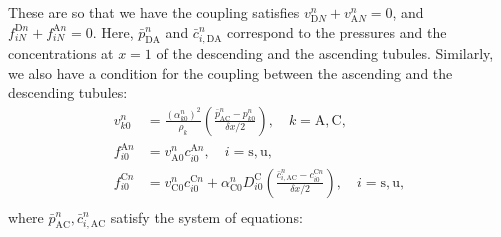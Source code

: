 \documentclass{article}
\begin{document}
These are so that we have the coupling satisfies $v_{\mathrm{D} N}^n+v_{\mathrm{A} N}^n = 0$, and $f_{iN}^{\mathrm{D}n}+ f_{iN}^{\mathrm{A}n} = 0$.
Here, $\bar{p}_{\mathrm{DA}}^n$ and $\bar{c}_{i,\mathrm{DA}}^n$ correspond to the pressures and the concentrations at $x=1$ of the descending and the ascending tubules.
Similarly, we also have a condition for the coupling between the ascending and the descending tubules:
\begin{align}
    v_{k0}^n &= \frac{(\alpha_{k0}^n)^2}{\rho_k}\left( \frac{\bar{p}_{\mathrm{AC}}^n-p_{k0}^n}{\delta x/2} \right),\quad k=\mathrm{A},\mathrm{C},\\ 
    f_{i 0}^{\mathrm{A}n} &= v_{\mathrm{A} 0}^{n}c_{i 0}^{\mathrm{A} n},\quad i=\mathrm{s},\mathrm{u},\\
    f_{i 0}^{\mathrm{C}n} &= v_{\mathrm{C} 0}^{n}c_{i 0}^{\mathrm{C} n}+\alpha_{\mathrm{C}0}^{n}D_{i0}^{\mathrm{C}}\left( \frac{\bar{c}_{i,\mathrm{AC}}^{n} - c_{i0}^{\mathrm{C}n}}{\delta x/2} \right),\quad i=\mathrm{s},\mathrm{u},\\
\end{align}
    where
    $\bar{p}_{\mathrm{AC}}^{n},\bar{c}_{i,\mathrm{AC}}^{n}$ satisfy the system of equations:
\end{document}
